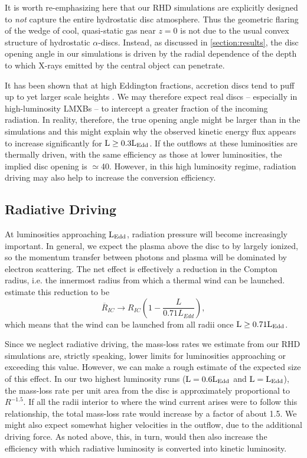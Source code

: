 \documentclass[a4paper,fleqn,usenatbib]{mnras}
\begin{document}
It is worth re-emphasizing here that our RHD simulations are
explicitly designed to {\em not} capture the entire hydrostatic disc
atmosphere. Thus the geometric flaring of the wedge of cool,
quasi-static gas near $z=0$ is not due to the usual convex structure
of hydrostatic $\alpha$-discs. Instead, as discussed
in \ref{section:results}, the disc opening angle in our simulations
is driven by the radial dependence of the depth to which X-rays
emitted by the central object can penetrate.

It has been shown that at high Eddington
fractions,  accretion discs tend to puff up to yet larger scale heights
\citep[][but also see
\citealt{2016A&A...587A..13L}]{1988ApJ...332..646A,2005MNRAS.357..295O}. We
may therefore expect real discs -- especially in high-luminosity LMXBs
-- to intercept a greater fraction of the incoming radiation. 
In reality, therefore, the true opening angle might be larger than in
the simulations and this
might explain why the observed kinetic energy flux appears to increase
significantly for $\rm{L \geq 0.3L_{Edd}}$. If the outflows at these
luminosities are thermally driven, with the same efficiency as those
at lower luminosities, the implied disc opening is
$\simeq$40\degree. However, in this high luminosity regime, radiation
driving may also help to increase the conversion efficiency.

\subsection{Radiative Driving}
\label{section:radiative_driving}

At luminosities approaching $\rm{L_{Edd}}$, radiation pressure will
become increasingly important. In general, we expect the plasma above
the disc to by largely ionized, so the momentum transfer between
photons and plasma will be dominated by electron scattering. The net
effect is effectively a reduction in the Compton radius, i.e. the
innermost radius from which a thermal wind can be
launched. \cite{2018MNRAS.473..838D} estimate this reduction to be 
\begin{equation}
\overline{R}_{IC} \rightarrow R_{IC}\left(1-\frac{L}{0.71L_{Edd}}\right),
\end{equation}
which means that the wind can be launched from all radii once $\rm{L \geq 0.71L_{Edd}}$.

Since we neglect radiative driving, the mass-loss rates we estimate from
our RHD simulations are, strictly speaking, lower limits for
luminosities approaching or exceeding this value. However, we can make
a rough estimate of the expected size of this effect. In our two
highest luminosity runs ($\rm{L = 0.6L_{Edd}}$ and $\rm{L =
L_{Edd}}$), the mass-loss rate per unit area from the disc is
approximately proportional to $R^{-1.5}$. If all the radii interior to
where the wind current arises were to follow this relationship, the
total mass-loss rate would increase by a factor of about 1.5.  We
might also expect somewhat higher velocities in the outflow, due to
the additional driving force. As noted above, this, in turn, would
then also increase the efficiency with which radiative luminosity is
converted into kinetic luminosity.
\end{document}
